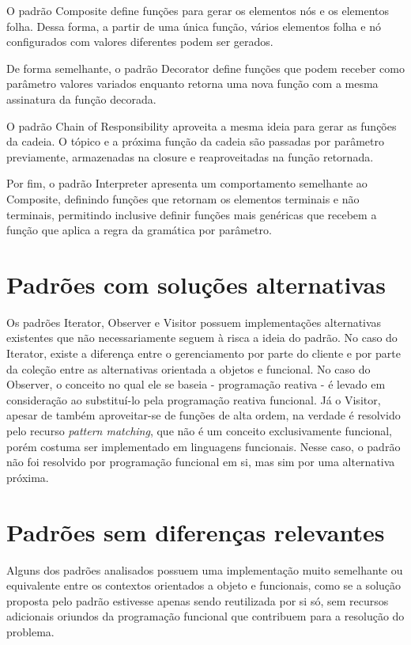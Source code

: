 O padrão Composite define funções para gerar os 
elementos nós e os elementos folha. Dessa forma, 
a partir de uma única função, vários elementos 
folha e nó configurados com valores diferentes 
podem ser gerados.

De forma semelhante, o padrão Decorator define 
funções que podem receber como parâmetro valores 
variados enquanto retorna uma nova função com 
a mesma assinatura da função decorada. 

O padrão Chain of Responsibility aproveita a mesma 
ideia para gerar as funções da cadeia. O tópico e 
a próxima função da cadeia são passadas por parâmetro 
previamente, armazenadas na closure e reaproveitadas 
na função retornada. 

Por fim, o padrão Interpreter apresenta um comportamento 
semelhante ao Composite, definindo funções que retornam 
os elementos terminais e não terminais, permitindo 
inclusive definir funções mais genéricas que recebem 
a função que aplica a regra da gramática por parâmetro.

\section{Padrões com soluções alternativas}

Os padrões Iterator, Observer e Visitor possuem 
implementações alternativas existentes que não 
necessariamente 
seguem à risca a ideia do padrão. No caso do Iterator, 
existe a diferença entre o gerenciamento por parte 
do cliente e por parte da coleção entre as 
alternativas orientada a objetos e funcional. No 
caso do Observer, o conceito no qual ele se 
baseia - programação reativa - é levado em 
consideração ao substituí-lo pela programação 
reativa funcional. Já o Visitor, apesar de também 
aproveitar-se de funções de alta ordem, na verdade 
é resolvido pelo recurso \textit{pattern matching}, 
que não é um conceito exclusivamente funcional, 
porém costuma ser implementado em linguagens 
funcionais. Nesse caso, o padrão não foi 
resolvido por programação funcional em si, 
mas sim por uma alternativa próxima. 

\section{Padrões sem diferenças relevantes}

Alguns dos padrões analisados possuem 
uma implementação muito semelhante ou 
equivalente entre os contextos orientados 
a objeto e funcionais, como se a solução 
proposta pelo padrão estivesse apenas 
sendo reutilizada por si só, sem 
recursos adicionais oriundos da programação 
funcional que contribuem para a 
resolução do problema. 

